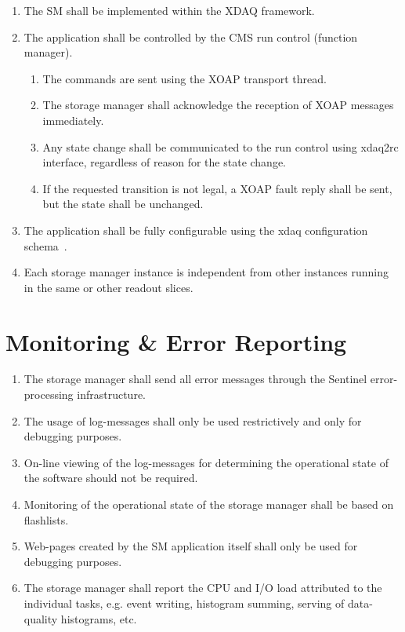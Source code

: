 \documentclass[]{article}
\begin{document}
\begin{enumerate}

\item The SM shall be implemented within the XDAQ framework.

\item The application shall be controlled by the CMS run control (function manager).
\begin{enumerate}
\item The commands are sent using the XOAP transport thread.
\item The storage manager shall acknowledge the reception of XOAP messages immediately.
\item Any state change shall be communicated to the run control using xdaq2rc interface, regardless of reason for the state change.
\item If the requested transition is not legal, a XOAP fault reply shall be sent, but the state shall be unchanged.
\end{enumerate}

\item The application shall be fully configurable using the xdaq configuration schema~\cite{xdaq_conf_schema}.

\item Each storage manager instance is independent from other instances running in the same or other readout slices.

\end{enumerate}

\section{Monitoring \& Error Reporting}

\begin{enumerate}

\item The storage manager shall send all error messages through the Sentinel error-processing infrastructure.

\item The usage of log-messages shall only be used restrictively and only for debugging purposes.

\item On-line viewing of the log-messages for determining the operational state of the software should not be required.

\item Monitoring of the operational state of the storage manager shall be based on flashlists.

\item Web-pages created by the SM application itself shall only be used for debugging purposes.

\item The storage manager shall report the CPU and I/O load attributed to the individual tasks, e.g. event writing, histogram summing, serving of data-quality histograms, etc.

\end{enumerate}
\end{document}
